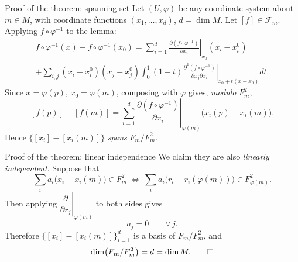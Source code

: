 \documentclass[10pt]{beamer}
\newcommand{\F}{\mathcal{F}}
\begin{document}
\begin{frame}{Proof of the theorem: spanning set}
	Let $(U, \varphi)$ be any coordinate system about $m \in M$, with
	coordinate functions $(x_1, \dots, x_d)$, $d = \dim M$. Let
	$[f] \in \widetilde{\F}_m$. Applying $f \circ \varphi^{-1}$ to the
	lemma:
	\begin{multline*}
		f \circ \varphi^{-1}(x) - f \circ \varphi^{-1}(x_0)
		= \sum_{i=1}^{d}
		\left. \frac{\partial (f \circ \varphi^{-1})}{\partial x_i}
		\right|_{x_0} (x_i - x_i^0) \\
		+ \sum_{i,j} (x_i - x_i^0)(x_j - x_j^0) \int_0^1 (1-t)
		\left. \frac{\partial^2 (f \circ \varphi^{-1})}
		{\partial x_j \partial x_i} \right|_{x_0 + t(x - x_0)} dt .
	\end{multline*}
	Since $x = \varphi(p)$, $x_0 = \varphi(m)$, composing with $\varphi$
	gives, \emph{modulo} $F_m^2$,
	\[
		[f(p)] - [f(m)]
		= \sum_{i=1}^{d}
		\left. \frac{\partial (f \circ \varphi^{-1})}{\partial x_i}
		\right|_{\varphi(m)} \bigl(x_i(p) - x_i(m)\bigr).
	\]
	Hence $\bigl\{ [x_i] - [x_i(m)] \bigr\}$ \emph{spans} $F_m / F_m^2$.
\end{frame}

\begin{frame}{Proof of the theorem: linear independence}
	We claim they are also \emph{linearly independent}. Suppose that
	\[
		\sum_i a_i \bigl(x_i - x_i(m)\bigr) \in F_m^2
		\ \Longleftrightarrow\
		\sum_i a_i \bigl(r_i - r_i(\varphi(m))\bigr) \in F_{\varphi(m)}^2 .
	\]
	Then applying $\left. \dfrac{\partial}{\partial r_j}
	\right|_{\varphi(m)}$ to both sides gives
	\[
		a_j = 0 \qquad \forall\, j .
	\]
	Therefore $\bigl\{ [x_i] - [x_i(m)] \bigr\}_{i=1}^{d}$ is a basis of
	$F_m / F_m^2$, and
	\[
		\dim\bigl(F_m / F_m^2\bigr) = d = \dim M . \qed
	\]
\end{frame}
\end{document}
